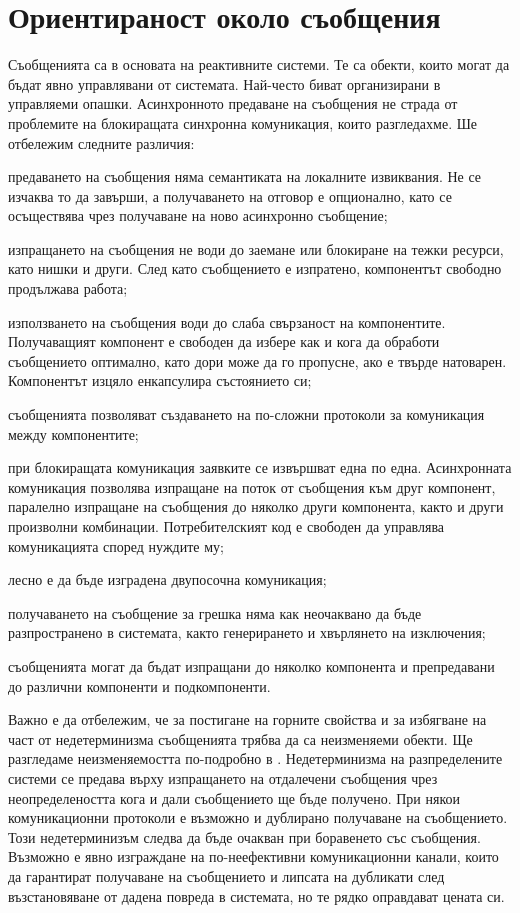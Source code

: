 \section{Ориентираност около съобщения}

Съобщенията са в основата на реактивните системи. Те са обекти, които могат да бъдат явно управлявани от системата. Най-често биват организирани в управляеми опашки. Асинхронното предаване на съобщения не страда от проблемите на блокиращата синхронна комуникация, които разгледахме. Ше отбележим следните различия:

\begin{itemize*}
  \item предаването на съобщения няма семантиката на локалните извиквания. Не се изчаква то да завърши, а получаването на отговор е опционално, като се осъществява чрез получаване на ново асинхронно съобщение;
  \item изпращането на съобщения не води до заемане или блокиране на тежки ресурси, като нишки и други. След като съобщението е изпратено, компонентът свободно продължава работа;
  \item използването на съобщения води до слаба свързаност на компонентите. Получаващият компонент е свободен да избере как и кога да обработи съобщението оптимално, като дори може да го пропусне, ако е твърде натоварен. Компонентът изцяло енкапсулира състоянието си;
  \item съобщенията позволяват създаването на по-сложни протоколи за комуникация между компонентите;
  \item при блокиращата комуникация заявките се извършват една по една. Асинхронната комуникация позволява изпращане на поток от съобщения към друг компонент, паралелно изпращане на съобщения до няколко други компонента, както и други произволни комбинации. Потребителският код е свободен да управлява комуникацията според нуждите му;
  \item лесно е да бъде изградена двупосочна комуникация;
  \item получаването на съобщение за грешка няма как неочаквано да бъде разпространено в системата, както генерирането и хвърлянето на изключения;
  \item съобщенията могат да бъдат изпращани до няколко компонента и препредавани до различни компоненти и подкомпоненти.
\end{itemize*}

Важно е да отбележим, че за постигане на горните свойства и за избягване на част от недетерминизма съобщенията трябва да са неизменяеми обекти. Ще разгледаме неизменяемостта по-подробно в . Недетерминизма на разпределените системи се предава върху изпращането на отдалечени съобщения чрез неопределеността кога и дали съобщението ще бъде получено. При някои комуникационни протоколи е възможно и дублирано получаване на съобщението. Този недетерминизъм следва да бъде очакван при боравенето със съобщения. Възможно е явно изграждане на по-неефективни комуникационни канали, които да гарантират получаване на съобщението и липсата на дубликати след възстановяване от дадена повреда в системата, но те рядко оправдават цената си.

